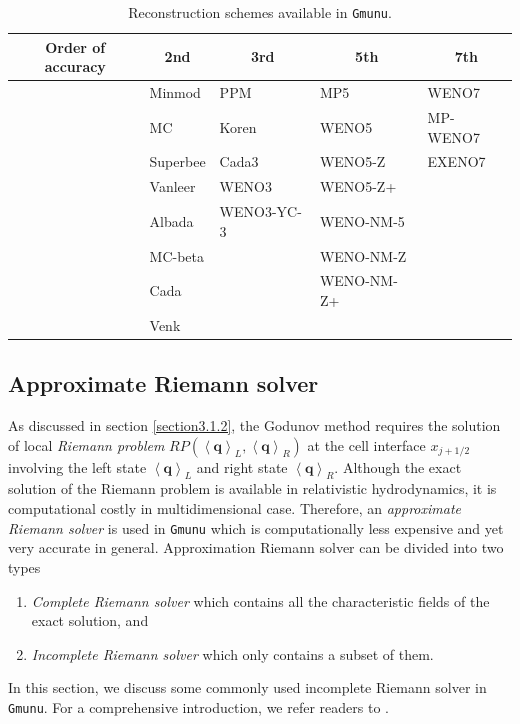 \begin{table}[h]
	\centering
	\caption{\label{tab:limiters}Reconstruction schemes available in \texttt{Gmunu}.}
	\begin{tabular}{ l | l | l | l | l }
		\multicolumn{1}{c|}{ Order of accuracy } & \multicolumn{1}{c|}{ 2nd } & \multicolumn{1}{c|}{ 3rd } & \multicolumn{1}{c|}{ 5th } & \multicolumn{1}{c}{ 7th }\\ \hline
		  & Minmod \cite{ziegler2011semi,kolgan1972application,van1979towards} 
          & PPM \cite{colella1984piecewise} & MP5 \cite{suresh1997accurate} & WENO7\\
		  & MC \cite{van1974towards} & Koren & WENO5 & MP-WENO7 \\
		  & Superbee \cite{roe1986characteristic} & Cada3 & WENO5-Z & EXENO7 \\
		  & Vanleer \cite{van1977towards} & WENO3 & WENO5-Z+ &  \\
		  & Albada & WENO3-YC-3 & WENO-NM-5 &  \\
		  & MC-beta &  & WENO-NM-Z &  \\
		  & Cada &  & WENO-NM-Z+ &  \\
		  & Venk &  &  &  \\
	\end{tabular}
\end{table}

\subsection{Approximate Riemann solver}
As discussed in section \ref{section3.1.2},
the Godunov method requires the solution of local \textit{Riemann problem }
$RP\left(\left\langle \mathbf{q} \right\rangle_{L}, \left\langle \mathbf{q} \right\rangle_{R} \right)$
at the cell interface $x_{j+1/2}$ involving the left state $\left\langle \mathbf{q} \right\rangle_{L}$
and right state $\left\langle \mathbf{q} \right\rangle_{R}$.
Although the exact solution of the Riemann problem is available in relativistic hydrodynamics,
it is computational costly in multidimensional case.
Therefore, an \textit{approximate Riemann solver} is used in \texttt{Gmunu}
which is computationally less expensive and yet very accurate in general.
Approximation Riemann solver can be divided into two types
\begin{enumerate}[label=(\roman*)]
    \item \textit{Complete Riemann solver} which contains all the characteristic fields of the exact solution, and
    \item \textit{Incomplete Riemann solver} which only contains a subset of them.
\end{enumerate}
In this section, we discuss some commonly used incomplete Riemann solver in \texttt{Gmunu}.
For a comprehensive introduction, we refer readers to \cite{toro2013riemann}.


